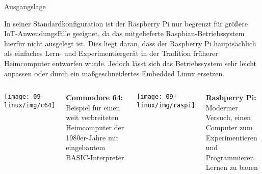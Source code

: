 {
\small

\begin{frame}{Ausgangslage}
    \parbox{\linewidth}{
        In seiner Standardkonfiguration ist der Raspberry Pi nur begrenzt für größere
        IoT-Anwendungsfälle geeignet, da das mitgelieferte Raspbian-Betriebssystem
        hierfür nicht ausgelegt ist. Dies liegt daran, dass der Raspberry Pi
        hauptsächlich als einfaches Lern- und Experimentiergerät in der Tradition
        früherer Heimcomputer entworfen wurde. Jedoch lässt sich das Betriebssystem
        sehr leicht anpassen oder durch ein maßgeschneidertes Embedded Linux ersetzen.
    }

    \medskip

    \begin{columns}[b,onlytextwidth]
        \begin{center}
            \texttt{[image: 09-linux/img/c64]}
        \end{center}
        \parbox{\linewidth}{
            \footnotesize
            \textbf{Commodore 64:}
            Beispiel für einen weit verbreiteten Heimcomputer der 1980er-Jahre
            mit eingebautem BASIC-Interpreter
        }

        \begin{center}
            \texttt{[image: 09-linux/img/raspi]}
        \end{center}
        \parbox{\linewidth}{
            \footnotesize
            \textbf{Rasbperry Pi:} Modermer Versuch, einen Computer zum
            Experimentieren und Programmieren Lernen zu bauen
        }
    \end{columns}
\end{frame}
}

